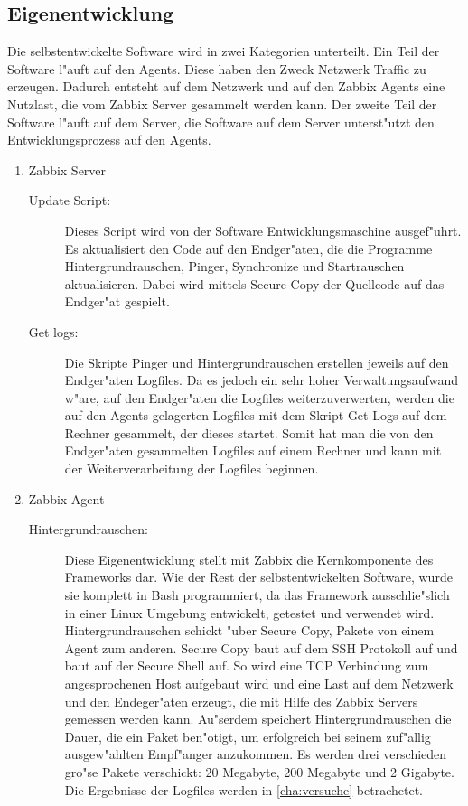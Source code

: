 \subsection{Eigenentwicklung}
Die selbstentwickelte Software wird in zwei Kategorien unterteilt. Ein Teil der Software l"auft %
auf den Agents. Diese haben den Zweck Netzwerk Traffic zu erzeugen. Dadurch entsteht auf dem Netzwerk und %
auf den Zabbix Agents eine Nutzlast, die vom Zabbix Server gesammelt werden kann. Der zweite Teil der Software %
l"auft auf dem Server, die Software auf dem Server unterst"utzt den Entwicklungsprozess auf den Agents. %
\begin{enumerate}
\item Zabbix Server 
\begin{description}
\item[Update Script:]Dieses Script wird von der Software Entwicklungsmaschine ausgef"uhrt. Es aktualisiert den Code auf den Endger"aten, %
die die Programme Hintergrundrauschen, Pinger, Synchronize und Startrauschen aktualisieren. Dabei wird mittels Secure Copy %
der Quellcode auf das Endger"at gespielt.

\item[Get logs:]Die Skripte Pinger und Hintergrundrauschen erstellen jeweils auf den Endger"aten Logfiles. %
Da es jedoch ein sehr hoher Verwaltungsaufwand w"are, auf den Endger"aten die Logfiles weiterzuverwerten, %
werden die auf den Agents gelagerten Logfiles mit dem Skript Get Logs auf dem Rechner gesammelt, der dieses startet. %
Somit hat man die von den Endger"aten gesammelten Logfiles auf einem Rechner und kann %
mit der Weiterverarbeitung der Logfiles beginnen.      

\end{description}

\item Zabbix Agent

\begin{description}
\item[Hintergrundrauschen:]Diese Eigenentwicklung stellt mit Zabbix die Kernkomponente des Frameworks dar. Wie %
der Rest der selbstentwickelten Software, wurde sie komplett in Bash programmiert, da das Framework ausschlie"slich %
in einer Linux Umgebung entwickelt, getestet und verwendet wird. Hintergrundrauschen schickt "uber Secure Copy, %
Pakete von einem Agent zum anderen. Secure Copy baut auf dem SSH Protokoll \autocite{artcl:thorbo} auf %
und baut auf der Secure Shell auf. So wird eine TCP Verbindung zum angesprochenen Host aufgebaut wird und %
eine Last auf dem Netzwerk und den Endeger"aten erzeugt, die mit Hilfe des Zabbix Servers  %
gemessen werden kann. Au"serdem speichert Hintergrundrauschen die Dauer, die ein Paket ben"otigt, um erfolgreich %
bei seinem zuf"allig ausgew"ahlten Empf"anger anzukommen. Es werden drei verschieden %
gro"se Pakete verschickt: 20 Megabyte, 200 Megabyte und 2 Gigabyte. Die Ergebnisse der Logfiles %
werden in \cref{cha:versuche} betrachetet.


\end{description}
\end{enumerate}
